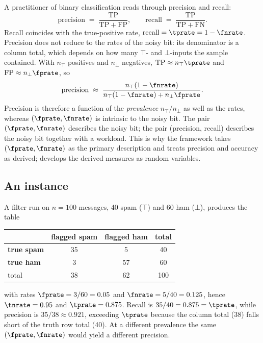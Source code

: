 A practitioner of binary classification reads  through
precision and recall:
\[
  \mathrm{precision} \;=\; \frac{\mathrm{TP}}{\mathrm{TP} + \mathrm{FP}},
  \qquad
  \mathrm{recall} \;=\; \frac{\mathrm{TP}}{\mathrm{TP} + \mathrm{FN}}.
\]
Recall coincides with the true-positive rate, $\mathrm{recall} = \tprate = 1 -
\fnrate$. Precision does not reduce to the rates of the noisy bit: its
denominator is a column total, which depends on how many $\top$- and
$\bot$-inputs the sample contained. With $n_\top$ positives and $n_\bot$
negatives, $\mathrm{TP} \approx n_\top \tprate$ and $\mathrm{FP} \approx n_\bot
\fprate$, so
\[
  \mathrm{precision}
  \;\approx\;
  \frac{n_\top (1 - \fnrate)}{n_\top (1 - \fnrate) + n_\bot \fprate}.
\]
Precision is therefore a function of the \emph{prevalence} $n_\top / n_\bot$ as
well as the rates, whereas $(\fprate, \fnrate)$ is intrinsic to the noisy bit.
The pair $(\fprate, \fnrate)$ describes the noisy bit; the pair (precision,
recall) describes the noisy bit together with a workload. This is why the
framework takes $(\fprate, \fnrate)$ as the primary description and treats
precision and accuracy as derived;  develops
the derived measures as random variables.

\subsection*{An instance}

A filter run on $n = 100$ messages, 40 spam ($\top$) and 60 ham ($\bot$),
produces the table

\begin{center}
\begin{tabular}{l|cc|c}
\hline
              & \textbf{flagged spam} & \textbf{flagged ham} & total \\
\hline
\textbf{true spam} & 35 & 5  & 40  \\
\textbf{true ham}  & 3  & 57 & 60  \\
\hline
total         & 38 & 62 & 100 \\
\hline
\end{tabular}
\end{center}

\noindent
with rates $\fprate = 3/60 = 0.05$ and $\fnrate = 5/40 = 0.125$, hence
$\tnrate = 0.95$ and $\tprate = 0.875$. Recall is $35/40 = 0.875 = \tprate$,
while precision is $35/38 \approx 0.921$, exceeding $\tprate$ because the column
total (38) falls short of the truth row total (40). At a different prevalence
the same $(\fprate, \fnrate)$ would yield a different precision.

